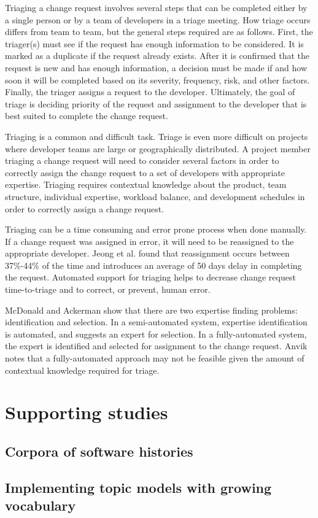 Triaging a change request involves several steps that can be completed
either by a single person or by a team of developers in a triage
meeting. How triage occurs differs from team to team, but the general
steps required are as follows. First, the triager(s) must see if the
request has enough information to be considered. It is marked as a
duplicate if the request already exists. After it is confirmed that the
request is new and has enough information, a decision must be made if
and how soon it will be completed based on its severity, frequency,
risk, and other factors. Finally, the triager assigns a request to the
developer. Ultimately, the goal of triage is deciding priority of the
request and assignment to the developer that is best suited to complete
the change request.

Triaging is a common and difficult task. Triage is even more difficult
on projects where developer teams are large or geographically
distributed. A project member triaging a
change request will need to consider several factors in order to
correctly assign the change request to a set of developers with
appropriate expertise. Triaging requires
contextual knowledge about the product, team structure, individual
expertise, workload balance, and development schedules in order to
correctly assign a change request.

Triaging can be a time consuming and error prone process when done
manually. If a change request was assigned in error, it will need to be
reassigned to the appropriate developer. Jeong et
al. found that reassignment occurs between
37\%-44\% of the time and introduces an average of 50 days delay in
completing the request. Automated support for triaging helps to decrease
change request time-to-triage and to correct, or prevent, human error.

McDonald and Ackerman show that there are two
expertise finding problems: identification and selection. In a
semi-automated system, expertise identification is automated, and
suggests an expert for selection. In a fully-automated system, the
expert is identified and selected for assignment to the change request.
Anvik notes that a fully-automated approach
may not be feasible given the amount of contextual knowledge required
for triage.

\section{Supporting studies}\label{supporting-studies}

\subsection{Corpora of software
histories}\label{corpora-of-software-histories}

\subsection{Implementing topic models with growing
vocabulary}\label{implementing-topic-models-with-growing-vocabulary}
